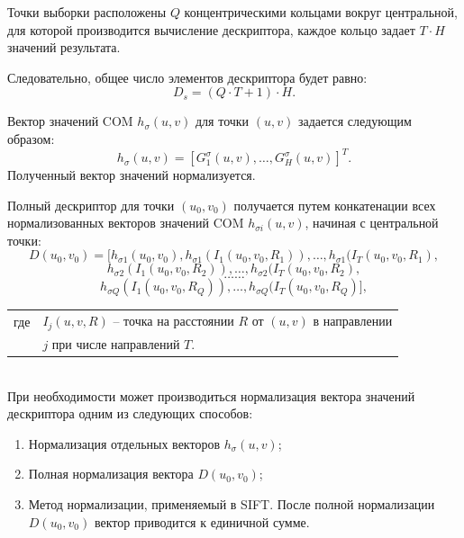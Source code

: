 {{{{		Точки выборки расположены $Q$ концентрическими кольцами вокруг центральной, для которой производится вычисление дескриптора, каждое кольцо задает $T \cdot H$ значений результата.
		
		Следовательно, общее число элементов дескриптора будет равно:
		\begin{equation}\label{elements_count}
		 D_s=(Q \cdot T+1)\cdot H.
		\end{equation}
		
		Вектор значений COM $h_\sigma(u,v)$ для точки $(u,v)$ задается следующим образом:
		\begin{equation}\label{single_vector}
		h_\sigma(u,v) = \left[G_1^\sigma(u,v), \dots, G_H^\sigma(u,v)\right]^T.
		\end{equation}
		Полученный вектор значений нормализуется. 
		
		Полный дескриптор для точки $(u_0,v_0)$ получается путем конкатенации всех нормализованных векторов значений COM $h_{\sigma i}(u,v)$, начиная с центральной точки:
		$$D(u_0,v_0) = [h_{\sigma 1}(u_0, v_0), h_{\sigma 1}(I_1(u_0, v_0, R_1)), \dots, h_{\sigma 1}(I_T(u_0, v_0, R_1),$$ 
		$$h_{\sigma 2}(I_1(u_0, v_0, R_2)), \dots, h_{\sigma 2}(I_T(u_0, v_0, R_2),$$
		$$\dots \dots$$
		$$h_{\sigma Q}(I_1(u_0, v_0, R_Q)), \dots, h_{\sigma Q}(I_T(u_0, v_0, R_Q)],$$
		\begin{tabular}{ rl }
			\quad \quad где 
			& $I_j(u, v, R)$ -- точка на расстоянии $R$ от $(u, v)$ в направлении\\
			& $j$ при числе направлений $T$.
		\end{tabular}\\
		
		При необходимости может производиться нормализация вектора значений дескриптора одним из следующих способов:
			\begin{enumerate}
				\item Нормализация отдельных векторов $h_\sigma(u,v)$;
				\item Полная нормализация вектора $D(u_0,v_0)$;
				\item Метод нормализации, применяемый в SIFT. После полной нормализации $D(u_0,v_0)$ вектор приводится к единичной сумме.
			\end{enumerate}
	
}}}}
